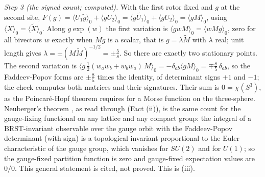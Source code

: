 \emph{Step 3 (the signed count; computed).} With the first rotor fixed and $g$ at the second site, $F(g) = \langle U_{1}\widetilde g\rangle_{0} + \langle gU_{2}\rangle_{0} = \langle g\widetilde{U_{1}}\rangle_{0} + \langle gU_{2}\rangle_{0} = \langle gM\rangle_{0}$, using $\langle X\rangle_{0} = \langle\widetilde X\rangle_{0}$. Along $g\exp(w)$ the first variation is $\langle gwM\rangle_{0} = \langle wMg\rangle_{0}$, zero for all bivectors $w$ exactly when $Mg$ is a scalar, that is $g = \lambda\widetilde M$ with $\lambda$ real; unit length gives $\lambda = \pm(M\widetilde M)^{-1/2} = \pm\tfrac58$. So there are exactly two stationary points. The second variation is $\langle g\,\tfrac12(w_{a}w_{b} + w_{b}w_{a})\,M\rangle_{0} = -\delta_{ab}\langle gM\rangle_{0} = \mp\tfrac85\,\delta_{ab}$, so the Faddeev-Popov forms are $\pm\tfrac85$ times the identity, of determinant signs $+1$ and $-1$; the check computes both matrices and their signatures. Their sum is $0 = \chi(S^{3})$, as the Poincar\'e-Hopf theorem requires for a Morse function on the three-sphere. Neuberger's theorem \cite{Neuberger1987}, as read through \cite{KalloniatisVonSmekalWilliams2005} (Fact (ii)), is the same count for the gauge-fixing functional on any lattice and any compact group: the integral of a BRST-invariant observable over the gauge orbit with the Faddeev-Popov determinant (with sign) is a topological invariant proportional to the Euler characteristic of the gauge group, which vanishes for $SU(2)$ and for $U(1)$; so the gauge-fixed partition function is zero and gauge-fixed expectation values are $0/0$. This general statement is cited, not proved. This is (iii).

